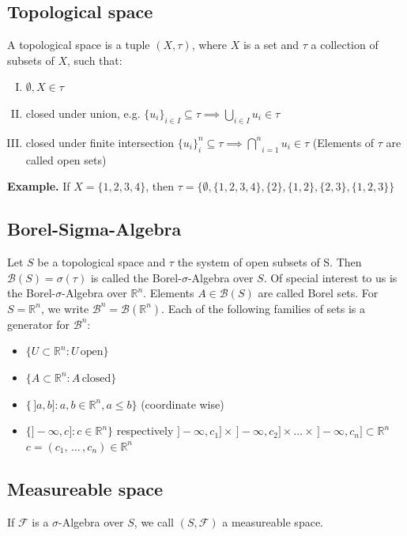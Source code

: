 \documentclass{scrarticle}
\begin{document}
\subsection{Topological space}
A topological space is a tuple $(X, \tau)$, where $X$ is a set and $\tau$ a collection of subsets of $X$, such that:
\begin{enumerate}[I.]
    \item $\emptyset, X \in \tau$
    \item closed under union, e.g. $\big \{ u_i \big \}_{i \in I} \subseteq \tau \implies \underset{i \in I}{\bigcup} u_i\in \tau$
    \item closed under finite intersection $\big \{ u_i \big \}_{i}^n \subseteq \tau \implies \underset{i=1}{\overset{n}{\bigcap}} u_i \in \tau$ (Elements of $\tau$ are called open sets)
\end{enumerate}

\textbf{Example.} If $X = \{1,2,3,4\}$, then $\tau =  \big \{\emptyset, \{1,2,3,4\}, \{2\}, \{1,2\}, \{2,3\}, \{1,2,3\} \big \}$

\subsection{Borel-Sigma-Algebra}
Let $S$ be a topological space and $\tau$ the system of open subsets of S. Then $\mathcal{B}(S) = \sigma(\tau)$ is called the Borel-$\sigma$-Algebra over $S$. Of special interest to us is the Borel-$\sigma$-Algebra over $\mathbb{R}^n$. Elements $A \in \mathcal{B}(S)$ are called Borel sets. For $S=\mathbb{R}^n$, we write $\mathcal{B}^n=\mathcal{B}(\mathbb{R}^n)$. Each of the following families of sets is a generator for $\mathcal{B}^n$:

\begin{itemize}
    \item $\{U \subset \mathbb{R}^n:U \, \text{open}\}$
    \item $\{A \subset \mathbb{R}^n:A \, \text{closed} \}$
    \item $\{\,]a,b]:a,b \in \mathbb{R}^n, a \leq b \}$ (coordinate wise)
    \item $\{]-\infty, c]:c \in \mathbb{R}^n\}$ respectively $]-\infty, c_1] \times \, ]-\infty, c_2] \times \ldots \times \, ]-\infty, c_n] \subset \mathbb{R}^n$ $c=(c_1, \, \ldots \, , c_n) \in \mathbb{R}^n$
\end{itemize}

\subsection{Measureable space}
If $\mathcal{F}$ is a $\sigma$-Algebra over $S$, we call $(S, \mathcal{F})$ a measureable space.
\end{document}
